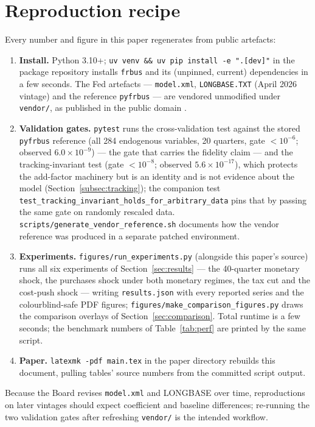 \section{Reproduction recipe}
\label{app:repro}

Every number and figure in this paper regenerates from public artefacts:

\begin{enumerate}
  \item \textbf{Install.} Python 3.10+; \texttt{uv venv \&\& uv pip install -e ".[dev]"} in the package repository installs \texttt{frbus} and its (unpinned, current) dependencies in a few seconds. The Fed artefacts --- \texttt{model.xml}, \texttt{LONGBASE.TXT} (April 2026 vintage) and the reference \texttt{pyfrbus} --- are vendored unmodified under \texttt{vendor/}, as published in the public domain \citep{fedfrbuspython}.
  \item \textbf{Validation gates.} \texttt{pytest} runs the cross-validation test against the stored \texttt{pyfrbus} reference (all 284 endogenous variables, 20 quarters, gate $<10^{-6}$; observed $6.0\times10^{-9}$) --- the gate that carries the fidelity claim --- and the tracking-invariant test (gate $<10^{-8}$; observed $5.6\times10^{-17}$), which protects the add-factor machinery but is an identity and is not evidence about the model (Section~\ref{subsec:tracking}); the companion test \texttt{test\_tracking\_invariant\_\allowbreak holds\_for\_arbitrary\_data} pins that by passing the same gate on randomly rescaled data. \texttt{scripts/generate\_vendor\_reference.sh} documents how the vendor reference was produced in a separate patched environment.
  \item \textbf{Experiments.} \texttt{figures/run\_experiments.py} (alongside this paper's source) runs all six experiments of Section~\ref{sec:results} --- the 40-quarter monetary shock, the purchases shock under both monetary regimes, the tax cut and the cost-push shock --- writing \texttt{results.json} with every reported series and the colourblind-safe PDF figures; \texttt{figures/make\_comparison\_figures.py} draws the comparison overlays of Section~\ref{sec:comparison}. Total runtime is a few seconds; the benchmark numbers of Table~\ref{tab:perf} are printed by the same script.
  \item \textbf{Paper.} \texttt{latexmk -pdf main.tex} in the paper directory rebuilds this document, pulling tables' source numbers from the committed script output.
\end{enumerate}

Because the Board revises \texttt{model.xml} and LONGBASE over time, reproductions on later vintages should expect coefficient and baseline differences; re-running the two validation gates after refreshing \texttt{vendor/} is the intended workflow.
